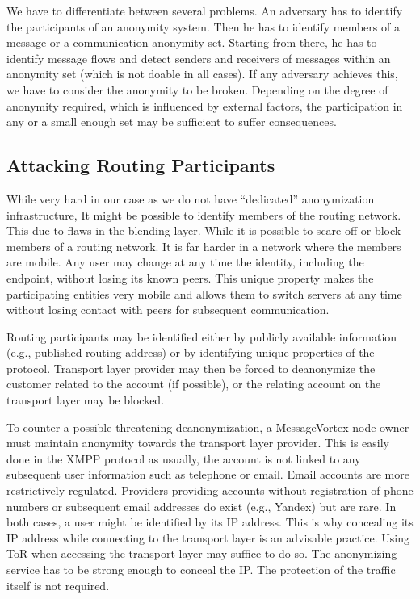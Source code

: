 We have to differentiate between several problems. An adversary has to identify the participants of an anonymity system. Then he has to identify members of a message or a communication anonymity set. Starting from there, he has to identify message flows and detect senders and receivers of messages within an anonymity set (which is not doable in all cases). If any adversary achieves this, we have to consider the anonymity to be broken. Depending on the degree of anonymity required, which is influenced by external factors, the participation in any or a small enough set may be sufficient to suffer consequences.

\subsection{Attacking Routing Participants}
While very hard in our case as we do not have ``dedicated'' anonymization infrastructure, It might be possible to identify members of the routing network. This due to flaws in the blending layer. While it is possible to scare off or block members of a routing network. It is far harder in a network where the members are mobile. Any user may change at any time the identity, including the endpoint, without losing its known peers. This unique property makes the participating entities very mobile and allows them to switch servers at any time without losing contact with peers for subsequent communication.

Routing participants may be identified either by publicly available information (e.g., published routing address) or by identifying unique properties of the protocol. Transport layer provider may then be forced to deanonymize the customer related to the account (if possible), or the relating account on the transport layer may be blocked. 

To counter a possible threatening deanonymization, a MessageVortex node owner must maintain anonymity towards the transport layer provider. This is easily done in the XMPP protocol as usually, the account is not linked to any subsequent user information such as telephone or email. Email accounts are more restrictively regulated. Providers providing accounts without registration of phone numbers or subsequent email addresses do exist (e.g., Yandex) but are rare. In both cases, a user might be identified by its IP address. This is why concealing its IP address while connecting to the transport layer is an advisable practice. Using ToR when accessing the transport layer may suffice to do so. The anonymizing service has to be strong enough to conceal the IP. The protection of the traffic itself is not required.

